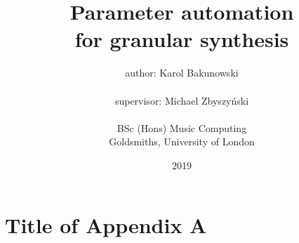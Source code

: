 \documentclass[a4paper]{report}
\begin{document}
\setlength{\TPHorizModule}{200mm} 
\setlength{\TPVertModule}{100mm} 
\textblockorigin{61mm}{19mm}
\setlength \parindent{0em}
\setlength \parskip{1em}


\onehalfspace{}


\providecommand{\OT}[1]{\operatorname{\Theta}\bigl(#1\bigr)}
\providecommand{\OOm}[1]{\operatorname{\Omega}\bigl(#1\bigr)}


\title{Parameter automation \\for granular synthesis}
\author{author: Karol Bakunowski \\
\\
supervisor: Michael Zbyszyński\\
\\
BSc (Hons) Music Computing\\
Goldsmiths, University of London
}

\date{2019}

\maketitle

  





\tableofcontents
\listoffigures
\listoftables















\appendix
\section{Title of Appendix A}

\printbibliography
\end{document}

